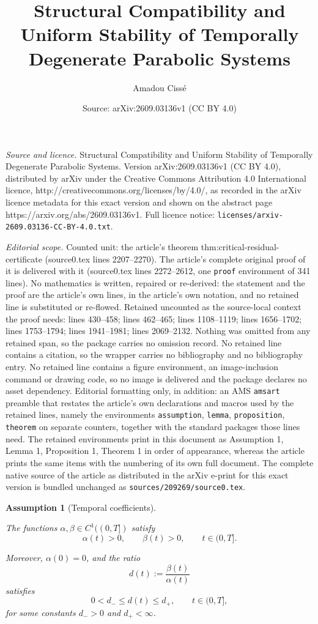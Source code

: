 \documentclass[10pt,a4paper]{amsart}
\title{Structural Compatibility and Uniform Stability of Temporally Degenerate Parabolic Systems}
\author{Amadou Ciss\'e}
\date{Source: arXiv:2609.03136v1 (CC BY 4.0)}
\newtheorem{assumption}{Assumption}
\begin{document}
\maketitle

\noindent\emph{Source and licence.} Structural Compatibility and Uniform Stability of Temporally Degenerate Parabolic Systems. Version arXiv:2609.03136v1 (CC BY 4.0), distributed by arXiv under the Creative Commons Attribution 4.0 International licence, http://creativecommons.org/licenses/by/4.0/, as recorded in the arXiv licence metadata for this exact version and shown on the abstract page https://arxiv.org/abs/2609.03136v1. Full licence notice: \texttt{licenses/arxiv-2609.03136-CC-BY-4.0.txt}.\par\smallskip

\noindent\textit{Editorial scope.} Counted unit: the article's theorem thm:critical-residual-certificate (source0.tex lines 2207--2270). The article's complete original proof of it is delivered with it (source0.tex lines 2272--2612, one \texttt{proof} environment of 341 lines). No mathematics is written, repaired or re-derived: the statement and the proof are the article's own lines, in the article's own notation, and no retained line is substituted or re-flowed.  Retained uncounted as the source-local context the proof needs: lines 430--458; lines 462--465; lines 1108--1119; lines 1656--1702; lines 1753--1794; lines 1941--1981; lines 2069--2132.  Nothing was omitted from any retained span, so the package carries no omission record.  No retained line contains a citation, so the wrapper carries no bibliography and no bibliography entry.  No retained line contains a figure environment, an image-inclusion command or drawing code, so no image is delivered and the package declares no asset dependency.  Editorial formatting only, in addition: an AMS \texttt{amsart} preamble that restates the article's own declarations and macros used by the retained lines, namely the environments \texttt{assumption}, \texttt{lemma}, \texttt{proposition}, \texttt{theorem} on separate counters, together with the standard packages those lines need.  The retained environments print in this document as Assumption 1, Lemma 1, Proposition 1, Theorem 1 in order of appearance, whereas the article prints the same items with the numbering of its own full document.  The complete native source of the article as distributed in the arXiv e-print for this exact version is bundled unchanged as \texttt{sources/209269/source0.tex}.
\begin{assumption}[Temporal coefficients]
\label{ass:time}

The functions \(\alpha,\beta\in C^{1}((0,T])\)
satisfy
\[
\alpha(t)>0,
\qquad
\beta(t)>0,
\qquad
t\in(0,T].
\]

Moreover,
\(\alpha(0)=0\),
and the ratio
\[
d(t):=\frac{\beta(t)}{\alpha(t)}
\]
satisfies
\begin{equation}
0<d_-\le d(t)\le d_+,
\qquad
t\in(0,T],
\label{eq:d-bounds}
\end{equation}
for some constants \(d_->0\) and \(d_+<\infty\).

\end{assumption}
\end{document}
